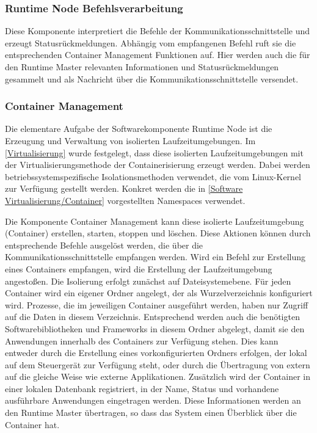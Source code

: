\subsubsection{Runtime Node Befehlsverarbeitung}

Diese Komponente interpretiert die Befehle der Kommunikationsschnittstelle und erzeugt Statusrückmeldungen. Abhängig vom empfangenen Befehl ruft sie die entsprechenden Container Management Funktionen auf. Hier werden auch die für den Runtime Master relevanten Informationen und Statusrückmeldungen gesammelt und als Nachricht über die Kommunikationsschnittstelle versendet.

\subsubsection{Container Management}

Die elementare Aufgabe der Softwarekomponente Runtime Node ist die Erzeugung und Verwaltung von isolierten Laufzeitumgebungen. Im \autoref{Virtualisierung} wurde festgelegt, dass diese isolierten Laufzeitumgebungen mit der Virtualisierungsmethode der Containerisierung erzeugt werden. Dabei werden betriebssystemspezifische Isolationsmethoden verwendet, die vom Linux-Kernel zur Verfügung gestellt werden. Konkret werden die in \autoref{Software Virtualisierung/Container} vorgestellten Namespaces verwendet. 

Die Komponente Container Management kann diese isolierte Laufzeitumgebung (Container) erstellen, starten, stoppen und löschen. Diese Aktionen können durch entsprechende Befehle ausgelöst werden, die über die Kommunikationsschnittstelle empfangen werden. Wird ein Befehl zur Erstellung eines Containers empfangen, wird die Erstellung der Laufzeitumgebung angestoßen. Die Isolierung erfolgt zunächst auf Dateisystemebene. Für jeden Container wird ein eigener Ordner angelegt, der als Wurzelverzeichnis konfiguriert wird. Prozesse, die im jeweiligen Container ausgeführt werden, haben nur Zugriff auf die Daten in diesem Verzeichnis. Entsprechend werden auch die benötigten Softwarebibliotheken und Frameworks in diesem Ordner abgelegt, damit sie den Anwendungen innerhalb des Containers zur Verfügung stehen. Dies kann entweder durch die Erstellung eines vorkonfigurierten Ordners erfolgen, der lokal auf dem Steuergerät zur Verfügung steht, oder durch die Übertragung von extern auf die gleiche Weise wie externe Applikationen. Zusätzlich wird der Container in einer lokalen Datenbank registriert, in der Name, Status und vorhandene ausführbare Anwendungen eingetragen werden. Diese Informationen werden an den Runtime Master übertragen, so dass das System einen Überblick über die Container hat.

